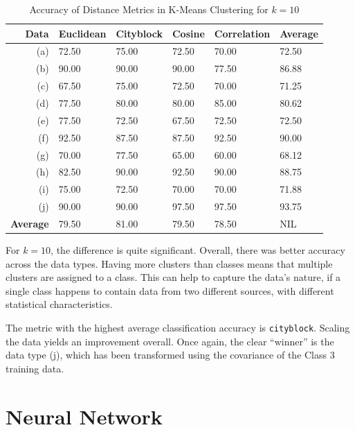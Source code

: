 \documentclass[a4paper, 10pt, conference]{ieeeconf}
\begin{document}
\begin{table}[!ht]
\centering
\caption{Accuracy of Distance Metrics in K-Means Clustering for $k = 10$}
\label{tbl:k10}
\begin{tabular}{|r|lllll|}
\hline
\textbf{Data} & \textbf{Euclidean} & \textbf{Cityblock} & \textbf{Cosine} & \textbf{Correlation} & \textbf{Average}\\ \hline
(a) & 72.50 & 75.00 & 72.50 & 70.00 & 72.50\\
(b) & 90.00 & 90.00 & 90.00 & 77.50 & 86.88\\
(c) & 67.50 & 75.00 & 72.50 & 70.00 & 71.25\\
(d) & 77.50 & 80.00 & 80.00 & 85.00 & 80.62\\
(e) & 77.50 & 72.50 & 67.50 & 72.50 & 72.50\\
(f) & 92.50 & 87.50 & 87.50 & 92.50 & 90.00\\
(g) & 70.00 & 77.50 & 65.00 & 60.00 & 68.12\\
(h) & 82.50 & 90.00 & 92.50 & 90.00 & 88.75\\
(i) & 75.00 & 72.50 & 70.00 & 70.00 & 71.88\\
(j) & 90.00 & 90.00 & 97.50 & 97.50 & 93.75\\
\textbf{Average} & 79.50 & 81.00 & 79.50 & 78.50 & NIL \\ \hline
\end{tabular}
\end{table}

For $k=10$, the difference is quite significant. Overall, there was better accuracy across the data types. Having more clusters than classes means that multiple clusters are assigned to a class. This can help to capture the data's nature, if a single class happens to contain data from two different sources, with different statistical characteristics.

 The metric with the highest average classification accuracy is \texttt{cityblock}. Scaling the data yields an improvement overall. Once again, the clear ``winner'' is the data type (j), which has been transformed using the covariance of the Class 3 training data.

\section{Neural Network}
\end{document}
